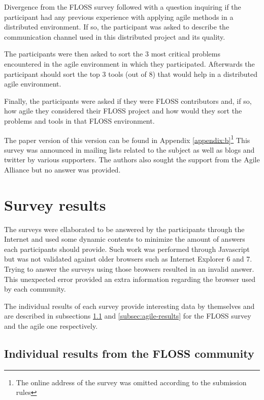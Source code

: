 \documentclass[lnbip]{svmultln}
\begin{document}
Divergence from the FLOSS survey followed with a question inquiring if
the participant had any previous experience with applying agile
methods in a distributed environment. If so, the participant was asked
to describe the communication channel used in this distributed project
and its quality.

The participants were then asked to sort the 3 most critical problems
encountered in the agile environment in which they
participated. Afterwards the participant should sort the top 3 tools
(out of 8) that would help in a distributed agile environment.

Finally, the participants were asked if they were FLOSS contributors
and, if so, how agile they considered their FLOSS project and how
would they sort the problems and tools in that FLOSS environment.

The paper version of this version can be found in Appendix
\ref{appendix:b}\footnote{The online address of the survey was omitted
  according to the submission rules}
This survey was announced in mailing lists related to the subject as
well as blogs and twitter by various supporters. The authors also
sought the support from the Agile Alliance but no answer was provided.

\section{Survey results}
\label{sec:results}

The surveys were ellaborated to be answered by the participants
through the Internet and used some dynamic contents to minimize the
amount of answers each participants should provide. Such work was
performed through Javascript but was not validated against older
browsers such as Internet Explorer 6 and 7. Trying to answer the
surveys using those browsers resulted in an invalid answer. This
unexpected error provided an extra information regarding the browser
used by each community.

The individual results of each survey provide interesting data by
themselves and are described in subsections \ref{subsec:floss-results}
and \ref{subsec:agile-results} for the FLOSS survey and the agile one
respectively.

\subsection{Individual results from the FLOSS community}
\label{subsec:floss-results}
\end{document}
